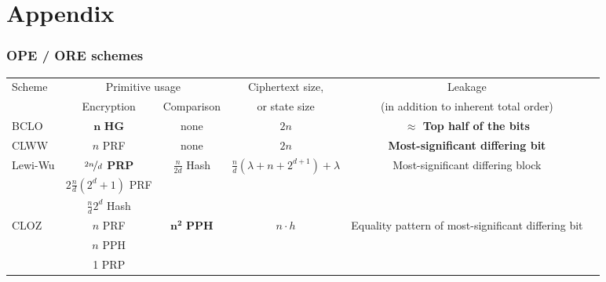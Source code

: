 \section{Appendix}

	\begin{frame}[label={frame:appendix:ore}]

		\frametitle{OPE / ORE schemes}

		\begin{table}
			\begin{adjustbox}{width=\linewidth}
				\begin{tabular}{ l c c c c c }

					\toprule

					\multirow{2}{*}{Scheme}						& \multicolumn{2}{c}{ Primitive usage}																	& Ciphertext size,																	& Leakage																\\ \cline{2-3}
					\rule{0pt}{10pt}							& Encryption												& Comparison								& or state size																	& (in addition to inherent total order)										\\

					\toprule

					BCLO \cite{crypt-db-ope}					& $\bm{n}$ \textbf{HG}										& none										& $2n$																				& \textbf{$\approx$ Top half of the bits}								\\

					\midrule

					CLWW \cite{practical-ore}					& $n$ PRF 													& none										& $2n$																				& \textbf{Most-significant differing bit}								\\

					\midrule

					\multirow{3}{*}{Lewi-Wu \cite{lewi-ore}}	& \boldmath{} $\nicefrac{2n}{d}$ \unboldmath{} \textbf{PRP}	& \multirow{3}{*}{$\frac{n}{2d}$ Hash}		& \multirow{3}{*}{$\frac{n}{d} \left(\lambda + n + 2^{d + 1} \right) + \lambda$}	& \multirow{3}{*}{Most-significant differing block}						\\
																& $2 \frac{n}{d} \left( 2^d + 1 \right)$ PRF				&											&																					&																		\\
																& $\frac{n}{d} 2^d$ Hash									&											&																					&																		\\

					\midrule

					\multirow{3}{*}{CLOZ \cite{adam-ore-v2}}	& $n$ PRF													& \multirow{3}{*}{$\bm{n^2}$ \textbf{PPH}}	& \multirow{3}{*}{$n \cdot h$}														& \multirow{3}{*}{Equality pattern of most-significant differing bit}	\\
																& $n$ PPH													&											&																					&																		\\
																& 1 PRP														&											&																					&																		\\


\end{tabular}
\end{adjustbox}
\end{table}
\end{frame}

